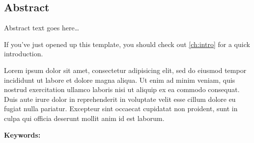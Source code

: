 \thispagestyle{fancy}
\fancyhf{}
\renewcommand{\headrulewidth}{0pt}
\fancyfoot[C]{\thepage}
\vspace*{\fill}

\begin{center}
    \section*{Abstract}
\end{center}
\begin{singlespace}
Abstract text goes here\dots{}

If you've just opened up this template, you should check out \autoref{ch:intro} for a quick introduction. 

Lorem ipsum dolor sit amet, consectetur adipisicing elit, sed do eiusmod tempor incididunt ut
labore et dolore magna aliqua. Ut enim ad minim veniam, quis nostrud exercitation ullamco
laboris nisi ut aliquip ex ea commodo consequat. Duis aute irure dolor in reprehenderit in
voluptate velit esse cillum dolore eu fugiat nulla pariatur. Excepteur sint occaecat cupidatat
non proident, sunt in culpa qui officia deserunt mollit anim id est laborum.

\textbf{Keywords:} \tkeywords
\end{singlespace}

\vspace*{\fill}




